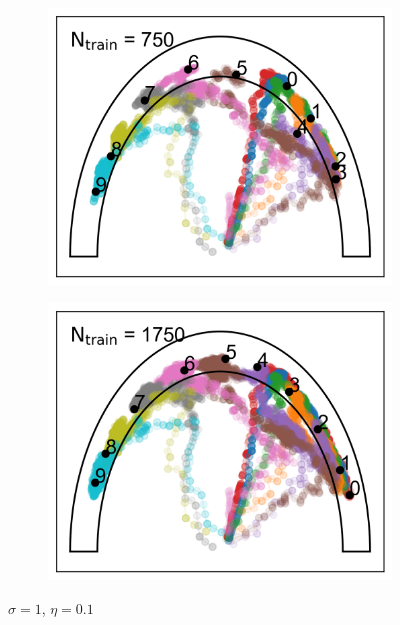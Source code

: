 \documentclass[aps,prb,twocolumn,superscriptaddress,floatfix,longbibliography]{revtex4-2}
\begin{document}
\begin{figure}
\begin{subfigure}[b]{0.24\textwidth}
      \centering
      \includegraphics[width=\textwidth]{ej2_fig1_3.png}
      \caption{\label{fig:ej2_fig1_3}}
  \end{subfigure}
  \hfill
  \begin{subfigure}[b]{0.24\textwidth}
      \centering
      \includegraphics[width=\textwidth]{ej2_fig1_4.png}
      \caption{\label{fig:ej2_fig1_4}}
  \end{subfigure}
     \caption{$\sigma = 1$, $\eta = 0.1$}
     \label{fig:ej2_fig1}
\end{figure}
\end{document}
